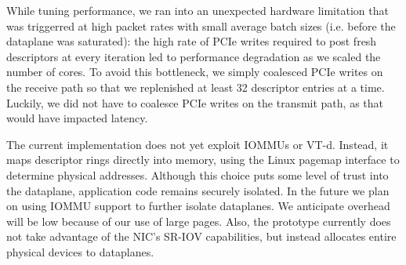 %


While tuning \ix performance, we ran into an unexpected hardware limitation
that was triggerred at high packet rates with small average batch sizes 
(i.e. before the dataplane was saturated): 
the high rate of PCIe writes required to post fresh
descriptors at every iteration led to performance degradation as we
scaled the number of cores.  To avoid this bottleneck, we
simply coalesced PCIe writes on the receive path so that we
replenished at least 32 descriptor entries at a time.  Luckily, we did
not have to coalesce PCIe writes on the transmit path, as that would
have impacted latency.


\begin{comment}
  \myparagraph{Using interrupts as a fallback:} Some applications
  service requests that require extended intervals of compute time. We
  intend for these requests to be delegated to from elastic threads to
  background threads in order to ensure that elastic threads remain
  responsive.  However, \ix can also be modified to better tolerate
  unanticipated delays during application processing in elastic
  threads.  One option would be to use interrupts as a fallback
  mode. On the receive side, the NIC would fire an interrupt whenever
  the recieve descriptor ring is almost full. The dataplane could then
  move packets from the receive ring to a software structure, averting
  buffer underrun. On the transmit side, NIC would fire an interrupt
  whenever the transmit ring becomes empty so that it can be
  refilled. Such an interrupt would only need to be armed when there
  is additional transmit data pending. A desirable property of this
  approach is that neither interrupt would be triggered as long as
  elastic threads are sufficiently responsive, but if an elastic
  thread misbehaves, the \ix dataplane would be able to regain control
  and catch up on network processing.
\end{comment}


 The current \ix
implementation does not yet exploit IOMMUs or VT-d. Instead, it maps
descriptor rings directly into \ix memory, using the Linux pagemap
interface to determine physical addresses.  Although this choice puts
some level of trust into the \ix dataplane, application code remains
securely isolated. In the future we plan on using IOMMU support to
further isolate \ix dataplanes. We anticipate overhead will be low
because of our use of large pages.  Also, the \ix prototype currently
does not take advantage of the NIC's SR-IOV capabilities, but instead
allocates entire physical devices to dataplanes.

